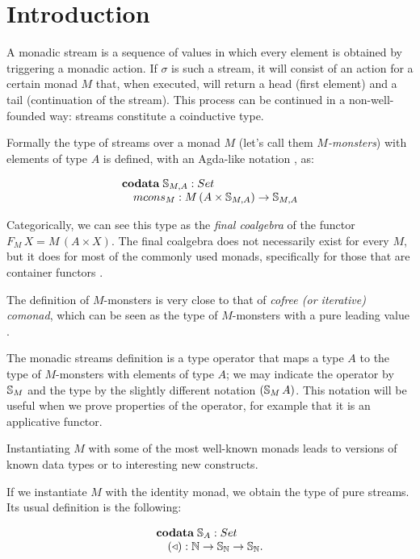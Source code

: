 \section{Introduction}

A monadic stream is a sequence of values in which every element is obtained by triggering a monadic action.
If $\sigma$ is such a stream, it will consist of an action for a certain monad $M$ that, when executed, will return a head (first element) and a tail (continuation of the stream).
This process can be continued in a non-well-founded way: streams constitute a coinductive type.

Formally the type of streams over a monad $M$ (let's call them {\em $M$-monsters}) with elements of type $A$ is defined, with an Agda-like notation \cite{agda}, as:

$$
\begin{array}[t]{l}
\codata\;
\stream{M,A}:\set\\
\quad \mcons_M: M\,(A\times \stream{M,A})\rightarrow\stream{M,A}
\end{array}
$$

Categorically, we can see this type as the {\em final coalgebra} of the functor $F_M\,X = M\,(A\times X)$.
The final coalgebra does not necessarily exist for every $M$, 
but it does for most of the commonly used monads, specifically for those that are container functors \cite{AAG:2005}.

The definition of $M$-monsters is very close to that of {\em cofree (or iterative) comonad}, which can be seen as the type of $M$-monsters with a pure 
leading value \cite{AAMV:2003,CUV:2006}.

The monadic streams definition is a type operator that maps a type $A$ to the type of $M$-monsters with elements of type $A$; we may indicate the operator by $\mathbb{S}_{M}$ and the type by the slightly different notation $(\mathbb{S}_{M}\,A)$.
This notation will be useful when we prove properties of the operator, for example that it is an applicative functor.

Instantiating $M$ with some of the most well-known monads leads to versions of known data types or to interesting new constructs.

If we instantiate $M$ with the identity monad, we obtain the type of pure streams.
Its usual definition is the following:

$$
\begin{array}[t]{l}
\codata\;
\stream{A}:\set\\
\quad (\scons): \nat\rightarrow \stream{\nat} \rightarrow\stream{\nat}.
\end{array}
$$

